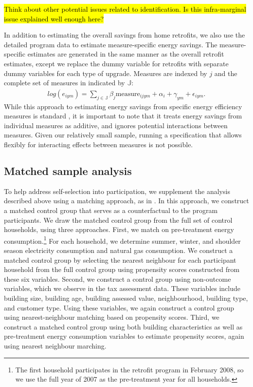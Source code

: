 \documentclass{article}
\newcommand{\hlc}[2][yellow]{ {\sethlcolor{#1} \hl{#2}} }
\begin{document}
\hlc{Think about other potential issues related to identification. Is this infra-marginal issue explained well enough here?}



In addition to estimating the overall savings from home retrofits, we also use the detailed program data to estimate measure-specific energy savings. The measure-specific estimates are generated in the same manner as the overall retrofit estimates, except we replace the dummy variable for retrofits with separate dummy variables for each type of upgrade. Measures are indexed by $j$ and the complete set of measures in indicated by $\mathbb{J}$:
\begin{align}
	log(e_{iym}) = \sum_{j \in \mathbb{J}} \beta_j \text{measure}_{ijym} + \alpha_i + \gamma_{ym} + \epsilon_{iym}.
	\label{eq:mbm}
\end{align}
While this approach to estimating energy savings from specific energy efficiency measures is standard \citep[e.g., ][]{chuang2022residential,liang2018energy}, it is important to note that it treats energy savings from individual measures as additive, and ignores potential interactions between measures. Given our relatively small sample, running a specification that allows flexibly for interacting effects between measures is not possible.

\subsection{Matched sample analysis}\label{sec:match}

To help address self-selection into participation, we supplement the analysis described above using a matching approach, as in \cite{chuang2022residential}. In this approach, we construct a matched control group that serves as a counterfactual to the program participants. We draw the matched control group from the full set of control households, using three approaches.  First, we match on pre-treatment energy consumption.\footnote{The first household participates in the retrofit program in February 2008, so we use the full year of 2007 as the pre-treatment year for all households.} For each household, we determine summer, winter, and shoulder season electricity consumption and natural gas consumption. We construct a matched control group by selecting the nearest neighbour for each participant household from the full control group using propensity scores constructed from these six variables.  Second, we construct a control group using non-outcome variables, which we observe in the tax assessment data.  These variables include building size, building age, building assessed value, neighbourhood, building type, and customer type. Using these variables, we again construct a control group using nearest-neighbour matching based on propensity scores.  Third, we construct a matched control group using both building characteristics as well as pre-treatment energy consumption variables to estimate propensity scores, again using nearest neighbour marching.
\end{document}

